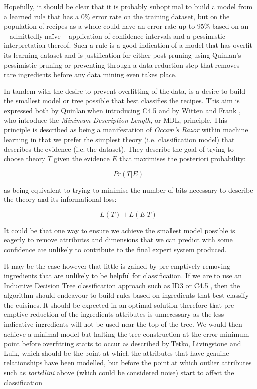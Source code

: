 \documentclass[11pt,a4paper]{article}
\begin{document}
Hopefully, it should be clear that it is probably suboptimal to build a model from
a learned rule that has a 0\% error rate on the training dataset, but
on the population of recipes as a whole could
have an error rate up to 95\% based on an -- admittedly na\"ive -- application of
confidence intervals and a pessimistic interpretation thereof.
Such a rule is a good indication of a model that has overfit
its learning dataset and is justification for either post-pruning using Quinlan's
pessimistic pruning or preventing through a data reduction step that removes rare
ingredients before any data mining even takes place.

In tandem with the desire to prevent overfitting of the data, is a desire to build
the smallest model or tree possible that best classifies the recipes. This
aim is expressed both by Quinlan when introducing C4.5 \cite{quinlan1993c4}
and by Witten and Frank \cite{witten2011data}, who introduce the
\emph{Minimum Description Length}, or MDL, principle. This principle is
described as being a manifestation of \emph{Occam's Razor} within machine learning
in that we prefer the simplest theory (i.e. classification model) that describes
the evidence (i.e. the dataset). They describe the goal of trying to choose
theory $T$ given the evidence $E$ that maximises the posteriori probability:

\begin{equation}
Pr(T | E)
\end{equation}

\noindent as being equivalent to trying to minimise the number of bits necessary
to describe the theory and its informational loss:

\begin{equation}
L(T) + L(E | T)
\end{equation}

It could be that one way to ensure we achieve the smallest model possible is eagerly to remove
attributes and dimensions that we can predict with some confidence are unlikely
to contribute to the final expert system produced.

It may be the case however that little is gained by pre-emptively removing
ingredients that are unlikely to be helpful for classification. If we are to use an Inductive
Decision Tree classification approach such as ID3 \cite{quinlan1986induction}
or C4.5 \cite{quinlan1993c4}, then the algorithm should endeavour to build
rules based on ingredients that best classify the cuisines. It should be expected
in an optimal solution therefore that pre-emptive reduction of the ingredients
attributes is unnecessary as the less indicative ingredients will not be used
near the top of the tree. We would then achieve a minimal model but halting
the tree construction at the error minimum point before overfitting starts
to occur as described by Tetko, Livingstone and Luik, \cite{tetko1995neural}
which should be the point at which the attributes that have genuine relationships
have been modelled, but before the point at which outlier attributes such as
\emph{tortellini} above (which could be considered noise) start to affect the
classification.
\end{document}

